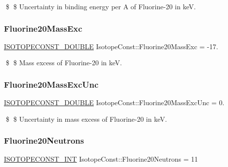 \$ \$ Uncertainty in binding energy per A of Fluorine-\/20 in keV. \mbox{\label{group___isotope_const-_fluorine-_f20_ga64a92786d8d6db92098745da01959784}} 
\subsubsection{\texorpdfstring{Fluorine20\+Mass\+Exc}{Fluorine20MassExc}}
{\footnotesize\ttfamily \mbox{\hyperlink{group___isotope_const-_macros_ga8f45a7272ce02c0b4c65c44636ed719a}{I\+S\+O\+T\+O\+P\+E\+C\+O\+N\+S\+T\+\_\+\+D\+O\+U\+B\+LE}} Isotope\+Const\+::\+Fluorine20\+Mass\+Exc = -\/17.}

\$ \$ Mass excess of Fluorine-\/20 in keV. \mbox{\label{group___isotope_const-_fluorine-_f20_ga5678fbb8dd304534d3f527d4feaaae8a}} 
\subsubsection{\texorpdfstring{Fluorine20\+Mass\+Exc\+Unc}{Fluorine20MassExcUnc}}
{\footnotesize\ttfamily \mbox{\hyperlink{group___isotope_const-_macros_ga8f45a7272ce02c0b4c65c44636ed719a}{I\+S\+O\+T\+O\+P\+E\+C\+O\+N\+S\+T\+\_\+\+D\+O\+U\+B\+LE}} Isotope\+Const\+::\+Fluorine20\+Mass\+Exc\+Unc = 0.}

\$ \$ Uncertainty in mass excess of Fluorine-\/20 in keV. \mbox{\label{group___isotope_const-_fluorine-_f20_ga6b72dc685497404223c9134f4d571e35}} 
\subsubsection{\texorpdfstring{Fluorine20\+Neutrons}{Fluorine20Neutrons}}
{\footnotesize\ttfamily \mbox{\hyperlink{group___isotope_const-_macros_ga5f18360b3e99483a35c32d789e62621c}{I\+S\+O\+T\+O\+P\+E\+C\+O\+N\+S\+T\+\_\+\+I\+NT}} Isotope\+Const\+::\+Fluorine20\+Neutrons = 11}

